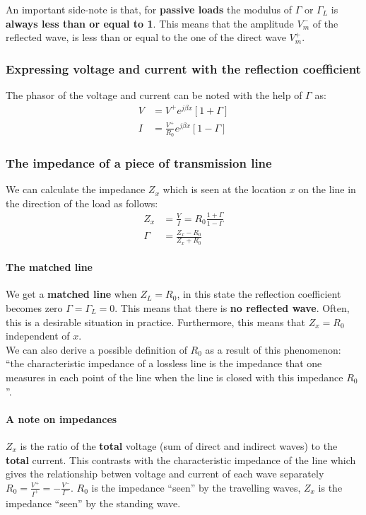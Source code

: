\documentclass[../transmission.tex]{subfiles}
\begin{document}
				An important side-note is that, for \textbf{passive loads} the modulus of $\Gamma$ or $\Gamma_L$ is \textbf{always less than or equal to 1}. This means that the amplitude $V_m^-$ of the reflected wave, is less than or equal to the one of the direct wave $V_m^+$.
				
			\subsubsection{Expressing voltage and current with the reflection coefficient}
				The phasor of the voltage and current can be noted with the help of $\Gamma$ as:
				\begin{align}
					V&=V^+e^{j\beta x}[1+\Gamma]\\
					I&=\frac{V^+}{R_0}e^{j\beta x}[1-\Gamma]
				\end{align}
			
			\subsubsection{The impedance of a piece of transmission line}
				We can calculate the impedance $Z_x$ which is seen at the location $x$ on the line in the direction of the load as follows:
				\begin{align}
					Z_x &= \frac{V}{I} = R_0\frac{1+\Gamma}{1-\Gamma}\\
					\Gamma&=\frac{Z_x-R_0}{Z_x+R_0}
				\end{align}
				
				\paragraph{The matched line}
					We get a \textbf{matched line} when $Z_L = R_0$, in this state the reflection coefficient becomes zero $\Gamma = \Gamma_L=0$. This means that there is \textbf{no reflected wave}. Often, this is a desirable situation in practice. Furthermore, this means that $Z_x = R_0$ independent of $x$.\\
					
					We can also derive a possible definition of $R_0$ as a result of this phenomenon: ``the characteristic impedance of a lossless line is the impedance that one measures in each point of the line when the line is closed with this impedance $R_0$''.
				
				\paragraph{A note on impedances}
					$Z_x$ is the ratio  of the \textbf{total} voltage (sum of direct and indirect waves) to the \textbf{total} current. This contrasts with the characteristic impedance of the line which gives the relationship betwen voltage and current of each wave  separately $R_0 = \frac{V^+}{I^+} = -\frac{V^-}{I^-}$. $R_0$ is the impedance ``seen'' by the travelling waves,  $Z_x$ is the impedance ``seen'' by the standing wave. 
				
\end{document}
